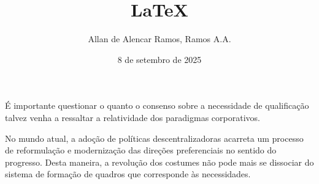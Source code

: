 \documentclass[12pt, a4paper]{article}
\begin{document}
\title{LaTeX}
\author{Allan de Alencar Ramos, Ramos A.A.}
\date{8 de setembro de 2025}
\maketitle

\onehalfspacing

\begin{flushleft}
É importante questionar o quanto o consenso sobre a necessidade de qualificação talvez venha a ressaltar a relatividade dos paradigmas corporativos.\\
\end{flushleft}

No mundo atual, a adoção de políticas descentralizadoras acarreta um processo de reformulação e modernização das direções preferenciais no sentido do progresso.
Desta maneira, a revolução dos costumes não pode mais se dissociar do sistema de formação de quadros que corresponde às necessidades.
\end{document}

